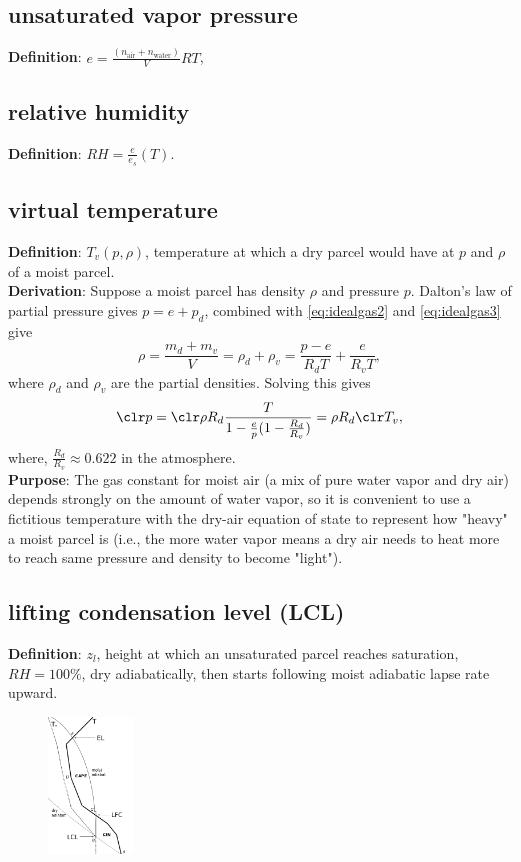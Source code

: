 \subsection{unsaturated vapor pressure}
{\bf Definition}: $e = \frac{(n_{\text{air}} + n_{\text{water}})}{V}RT$, 

\subsection{relative humidity}
{\bf Definition}: $RH = \frac{e}{e_s}(T)$.

\subsection{virtual temperature}

{\bf Definition}: $T_v(p,\rho)$, temperature at which a dry parcel would have at $p$ and $\rho$ of a
moist parcel. \\

{\bf Derivation}: Suppose a moist parcel has density $\rho$ and pressure $p$.
Dalton's law of partial pressure gives $p = e + p_d$, combined with \eqref{eq:idealgas2} and
\eqref{eq:idealgas3} give
\begin{equation}
   \rho = \frac{m_d + m_v}{V} = \rho_d + \rho_v = \frac{p-e}{R_dT} + \frac{e}{R_vT}, 
\end{equation}
where $\rho_d$ and $\rho_v$ are the partial densities.
Solving this gives
\begin{equation}
   {\clr p} = {\clr \rho} R_d \frac{T}{1-\frac{e}{p}(1-\frac{R_d}{R_v})} = \rho R_d {\clr T_v},
\end{equation}
where, $\frac{R_d}{R_v} \approx 0.622$ in the atmosphere. \\

{\bf Purpose}:
The gas constant for moist air (a mix of pure water vapor and dry air) depends strongly on the
amount of water vapor, so it is convenient to use a fictitious temperature with the dry-air equation
of state to represent how "heavy" a moist parcel is (i.e., the more water vapor means a dry air
needs to heat more to reach same pressure and density to become "light"). \\

\subsection{lifting condensation level (LCL)}
{\bf Definition}: $z_l$, height at which an unsaturated parcel reaches saturation, $RH=100\%$, dry
adiabatically, then starts following moist adiabatic lapse rate upward. 
\begin{figure} [H] 
   \includegraphics[width=0.2\textwidth, height=0.3\textwidth]{sounding.png}
   \caption{\label{sounding}}
\end{figure}

